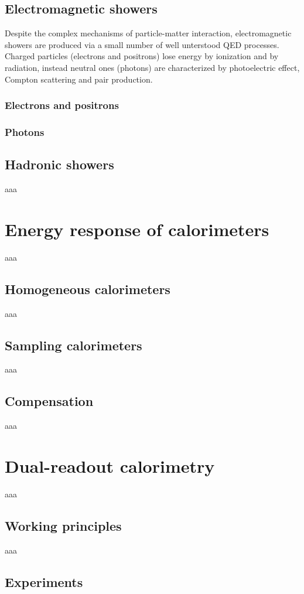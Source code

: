 \subsection{Electromagnetic showers} \label{subsec:em_shower}
Despite the complex mechanisms of particle-matter interaction, electromagnetic showers are produced via a small number of well unterstood QED processes. Charged particles (electrons and positrons) lose energy by ionization and by radiation, instead neutral ones (photons) are characterized by photoelectric effect, Compton scattering and pair production.

\subsubsection*{Electrons and positrons}

\subsubsection*{Photons}

\subsection{Hadronic showers} \label{subsec:had_shower}
aaa

\section{Energy response of calorimeters}
aaa

\subsection{Homogeneous calorimeters}
aaa

\subsection{Sampling calorimeters}
aaa

\subsection{Compensation}
aaa

\section{Dual-readout calorimetry}
aaa

\subsection{Working principles}
aaa

\subsection{Experiments}